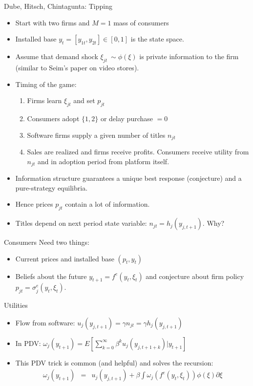 \documentclass[xcolor=pdftex,dvipsnames,table,mathserif,aspectratio=169]{beamer}
\begin{document}
\begin{frame}{Dube, Hitsch, Chintagunta: Tipping}

\begin{itemize}
\item Start with two firms and $M=1$ mass of consumers
\item Installed base $y_{t} = [y_{1t},y_{2t}] \in [0,1]$ is the state space.
\item Assume that demand shock $\xi_{jt}~\sim \phi(\xi)$ is private information to the firm (similar to Seim's paper on video stores).
\item Timing of the game:
\begin{enumerate}
\item Firms learn $\xi_{jt}$ and set $p_{jt}$
\item Consumers adopt $\{1,2\}$ or delay purchase $=0$
\item Software firms supply a given number of titles $n_{jt}$
\item Sales are realized and firms receive profits. Consumers receive utility from $n_{jt}$ and in adoption period from platform itself.
\end{enumerate}
\item Information structure guarantees a unique best response (conjecture) and a pure-strategy equilibria.
\item Hence prices $p_{jt}$ contain a lot of information.
\end{itemize}
\end{frame}



\begin{frame}{}

\begin{itemize}
\item Titles depend on next period state variable: $n_{jt} = h_j(y_{j,t+1})$. Why?
\end{itemize}
\end{frame}

\begin{frame}{Consumers}
Need two things:
\begin{itemize}
\item Current prices and installed base $(p_t, y_t)$
\item Beliefs about the future $y_{t+1} = f^e(y_t,\xi_t)$ and conjecture about firm policy $p_{jt} = \sigma_j^e(y_t,\xi_t)$.
\end{itemize}
Utilities
\begin{itemize}
\item Flow from software: $u_j(y_{j,t+1}) = \gamma n_{jt} = \gamma h_j (y_{j,t+1})$
\item In PDV: $\omega_j (y_{t+1}) = E [ \sum_{k=0}^{\infty} \beta^k u_j(y_{j,t+1+k}) | y_{t+1}]$
\item This PDV trick is common (and helpful) and solves the recursion:
\begin{eqnarray*}
\omega_j(y_{t+1}) &=& u_j(y_{j,t+1}) + \beta \int  \omega_j( f^e(y_t,\xi_t)) \phi(\xi) \partial \xi\\
\end{eqnarray*}
\end{itemize}
\end{frame}
\end{document}
